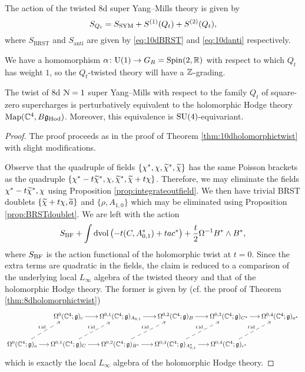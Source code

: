 \documentclass[10pt, oneside]{article}
\renewcommand{\U}{\mathrm{U}}
\begin{document}
The action of the twisted 8d super Yang--Mills theory is given by
\[S_{Q_t} = S_{\rm SYM} + S^{(1)}(Q_t) + S^{(2)}(Q_t),\]
where $S_{\mathrm{BRST}}$ and $S_{\mathrm{anti}}$ are given by \eqref{eq:10dBRST} and \eqref{eq:10danti} respectively.

We have a homomorphism $\alpha\colon \U(1)\rightarrow G_R=\Spin(2, \RR)$ with respect to which $Q_t$ has weight $1$, so the $Q_t$-twisted theory will have a $\mathbb Z$-grading.

\begin{theorem}
The twist of 8d $\mathcal N=1$ super Yang--Mills with respect to the family $Q_t$ of square-zero supercharges is perturbatively equivalent to the holomorphic Hodge theory $\operatorname{Map}(\mathbb C^4, B\mathfrak g_{\mathrm{Hod}})$. Moreover, this equivalence is $\mathrm{SU}(4)$-equivariant.
\label{thm:8dHodgetwist}
\end{theorem}
\begin{proof}
The proof proceeds as in the proof of Theorem \ref{thm:10dholomorphictwist} with slight modifications.

Observe that the quadruple of fields $\{\chi^*, \chi, \widetilde{\chi}^*, \widetilde{\chi}\}$ has the same Poisson brackets as the quadruple $\{\chi^*-t\widetilde{\chi}^*, \chi, \widetilde{\chi}^*, \widetilde{\chi} + t\chi\}$. Therefore, we may eliminate the fields $\chi^*-t\widetilde{\chi}^*, \chi$ using Proposition \ref{prop:integrateoutfield}. We then have trivial BRST doublets $\{\widetilde{\chi} + t\chi, \widetilde{a}\}$ and $\{\rho, A_{1, 0}\}$ which may be eliminated using Proposition \ref{prop:BRSTdoublet}. We are left with the action
\[S_{\mathrm{BF}} + \int\operatorname{dvol}\left(-t(C, A_{0, 1}^*) + ta c^*\right) + \frac{t}{2} \Omega^{-1} B^*\wedge B^*,\]
where $S_{\mathrm{BF}}$ is the action functional of the holomorphic twist at $t=0$. Since the extra terms are quadratic in the fields, the claim is reduced to a comparison of the underlying local $L_\infty$ algebra of the twisted theory and that of the holomorphic Hodge theory. The former is given by (cf. the proof of Theorem \ref{thm:8dholomorphictwist})
\[
\xymatrix@C=0.5cm{
&\Omega^0(\CC^4; \gg)_c \ar[r] &\Omega^{0,1}(\CC^4; \gg)_{A_{0,1}} \ar[r] &\Omega^{0,2}(\CC^4; \gg)_{B} \ar[r] &\Omega^{0,3}(\CC^4; \gg)_{C^*} \ar[r] &\Omega^{0,4}(\CC^4; \gg)_{a^*} \\
\Omega^0(\CC^4; \gg)_a \ar[r] \ar@{-->}^{t\id}[ur] & \Omega^{0,1}(\CC^4; \gg)_C \ar[r] \ar@{-->}^{t\id}[ur] &\Omega^{0,2}(\CC^4; \gg)_{B^*} \ar[r] \ar@{-->}^{t\id}[ur] &\Omega^{0,3}(\CC^4; \gg)_{A_{0,1}^*} \ar[r] \ar@{-->}^{t\id}[ur] &\Omega^{0,4}(\CC^4; \gg)_{c^*} \ar@{-->}^{t\id}[ur] &
}
\]
which is exactly the local $L_\infty$ algebra of the holomorphic Hodge theory.
\end{proof}
\end{document}
